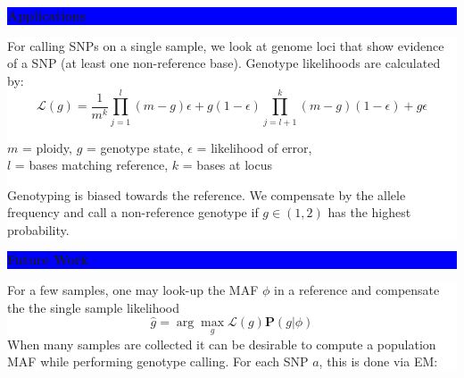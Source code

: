 \documentclass[11pt]{a0poster}
\begin{document}
{\begin{minipage}[t][2045pt][t]{\linewidth}
\begin{minipage}{0.6\linewidth}
\vspace{75pt}
\begin{minipage}{0.47\linewidth}
\colorbox{Blue}{
\begin{minipage}[t]{\linewidth}
\vspace{30pt}
\begin{center}
\Huge \bf \color{White} Applications
\end{center}
\vspace{17pt}
\end{minipage}
}
\colorbox{White}{
\begin{minipage}[t][795pt][t]{\linewidth}
\color{Blue}
\vspace{20pt}
\LARGE For calling SNPs on a single sample, we look at genome loci that show evidence
of a SNP (at least one non-reference base). Genotype likelihoods are calculated
by:
\large$$\mathcal{L}(g)=\frac{1}{m^k}\prod_{j=1}^{l}{(m - g) \epsilon + g (1 - \epsilon)}\prod_{j=l + 1}^{k}{(m - g)(1 - \epsilon) + g \epsilon}$$
\begin{center}
\small $m$ = ploidy, $g$ = genotype state, $\epsilon$ = likelihood of error, \\
$l$ = bases matching reference, $k$ = bases at locus
\end{center}
\LARGE Genotyping is biased towards the reference. We compensate by the allele
frequency and call a non-reference genotype if $g \in (1, 2)$ has the highest probability.
\pagebreak
\end{minipage}
}
\end{minipage}
\begin{minipage}{0.06\linewidth}
\hfill
\pagebreak
\end{minipage}
\begin{minipage}{0.47\linewidth}
\colorbox{Blue}{
\begin{minipage}[t]{\linewidth}
\vspace{30pt}
\begin{center}
\Huge \bf \color{White} Future Work
\end{center}
\vspace{17pt}
\end{minipage}
}
\colorbox{White}{
\begin{minipage}[t][795pt][t]{\linewidth}
\color{Blue}
\vspace{20pt}
\LARGE For a few samples, one may look-up the MAF $\phi$ in a reference and compensate the
the single sample likelihood
\large $$\hat{g} = \arg\max_{g} \mathcal{L}(g)\mathbf{P}(g | \phi)$$ 
\LARGE When many samples are collected it can be desirable to compute a population MAF while
performing genotype calling. For each SNP $a$, this is done via EM:


\end{minipage}}
\end{minipage}
\end{minipage}
\end{minipage}}
\end{document}
